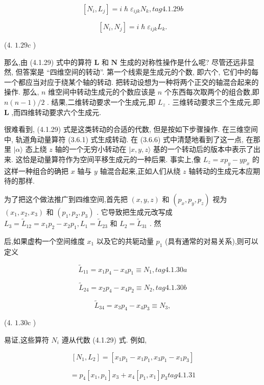 $$
\left\lbrack {{N}_{i},{L}_{j}}\right\rbrack = i\hslash {\varepsilon }_{ijk}{N}_{k}, tag{4.1.29b}
$$

$$
\left\lbrack {{N}_{i},{N}_{j}}\right\rbrack = i\hslash {\varepsilon }_{ijk}{L}_{k}.
$$

(4. ${1.29c}$ )

那么,由 (4.1.29) 式中的算符 $\mathbf{L}$ 和 $\mathbf{N}$ 生成的对称性操作是什么呢? 尽管还远非显然, 但答案是 “四维空间的转动”. 第一个线索是生成元的个数, 即六个, 它们中的每一个都应当对应于绕某个轴的转动. 把转动设想为一种将两个正交的轴混合起来的操作. 那么, $n$ 维空间中转动生成元的个数应该是 $n$ 个东西每次取两个的组合数,即 $n\left( {n - 1}\right) /2$ . 结果,二维转动要求一个生成元,即 ${L}_{z}$ . 三维转动要求三个生成元,即 $\mathbf{L}$ ,而四维转动要求六个生成元.

很难看到, (4.1.29) 式是这类转动的合适的代数, 但是按如下步骤操作. 在三维空间中, 轨道角动量算符 (3.6.1) 式生成转动. 在 (3.6.6) 式中清楚地看到了这一点, 在那里 $|\alpha \rangle$ 态上绕 $z$ 轴的一个无穷小转动在 $|x, y, z\rangle$ 基的一个转动后的版本中表示了出来. 这恰是动量算符作为空间平移生成元的一种后果. 事实上,像 ${L}_{z} = x{p}_{y} - y{p}_{x}$ 的这样一种组合的确把 $x$ 轴与 $y$ 轴混合起来,正如人们从绕 $z$ 轴转动的生成元本应期待的那样.

为了把这个做法推广到四维空间,首先把 $\left( {x, y, z}\right)$ 和 $\left( {{p}_{x},{p}_{y},{p}_{z}}\right)$ 视为 $\left( {{x}_{1},{x}_{2},{x}_{3}}\right)$ 和 $\left( {{p}_{1},{p}_{2},{p}_{3}}\right)$ . 它导致把生成元改写成 ${L}_{3} = {\widetilde{L}}_{12} = {x}_{1}{p}_{2} - {x}_{2}{p}_{1},{L}_{1} = {\widetilde{L}}_{23}$ 和 ${L}_{2} = {\widetilde{L}}_{31}$ . 然

后,如果虚构一个空间维度 ${x}_{1}$ 以及它的共轭动量 ${p}_{1}$ (具有通常的对易关系),则可以定义

$$
{\widetilde{L}}_{11} = {x}_{1}{p}_{4} - {x}_{4}{p}_{1} \equiv {N}_{1}, tag{4. 1.30a}
$$

$$
{\widetilde{L}}_{24} = {x}_{2}{p}_{4} - {x}_{4}{p}_{2} \equiv {N}_{2}, tag{4. 1. 30b}
$$

$$
{\widetilde{L}}_{34} = {x}_{3}{p}_{4} - {x}_{4}{p}_{3} \equiv {N}_{3},
$$

(4. ${1.30}\mathrm{c}$ )

易证,这些算符 ${N}_{i}$ 遵从代数 (4.1.29) 式. 例如,

$$
\left\lbrack {{N}_{1},{L}_{2}}\right\rbrack = \left\lbrack {{x}_{1}{p}_{1} - {x}_{1}{p}_{1},{x}_{3}{p}_{1} - {x}_{1}{p}_{3}}\right\rbrack
$$

$$
= {p}_{4}\left\lbrack {{x}_{1},{p}_{1}}\right\rbrack {x}_{3} + {x}_{4}\left\lbrack {{p}_{1},{x}_{1}}\right\rbrack {p}_{3} tag{4. 1.31}
$$

